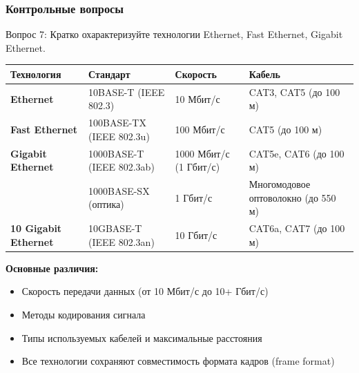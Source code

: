 \begin{frame}
\frametitle{Контрольные вопросы}
\begin{block}{Вопрос 7: Кратко охарактеризуйте технологии Ethernet, Fast Ethernet, Gigabit Ethernet.}
\begin{table}[h]
\centering
\begin{tabular}{|p{2cm}|p{3cm}|p{3cm}|p{1.5cm}|}
\hline
\textbf{Технология} & \textbf{Стандарт} & \textbf{Скорость} & \textbf{Кабель} \\
\hline
\textbf{Ethernet} & 10BASE-T (IEEE 802.3) & 10 Мбит/с & CAT3, CAT5 (до 100 м) \\
\hline
\textbf{Fast Ethernet} & 100BASE-TX (IEEE 802.3u) & 100 Мбит/с & CAT5 (до 100 м) \\
\hline
\textbf{Gigabit Ethernet} & 1000BASE-T (IEEE 802.3ab) & 1000 Мбит/с (1 Гбит/с) & CAT5e, CAT6 (до 100 м) \\
 & 1000BASE-SX (оптика) & 1 Гбит/с & Многомодовое оптоволокно (до 550 м) \\
\hline
\textbf{10 Gigabit Ethernet} & 10GBASE-T (IEEE 802.3an) & 10 Гбит/с & CAT6a, CAT7 (до 100 м) \\
\hline
\end{tabular}
\end{table}

\textbf{Основные различия:}
\begin{itemize}
    \item Скорость передачи данных (от 10 Мбит/с до 10+ Гбит/с)
    \item Методы кодирования сигнала
    \item Типы используемых кабелей и максимальные расстояния
    \item Все технологии сохраняют совместимость формата кадров (frame format)
\end{itemize}
\end{block}
\end{frame}

